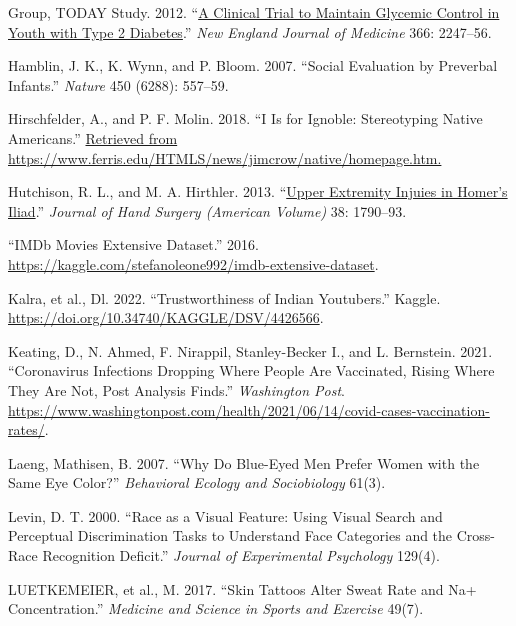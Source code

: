 \documentclass[
]{report}
\newlength{\cslhangindent}
\newenvironment{CSLReferences}[2] %
 {\begin{list}{}{%
  \setlength{\itemindent}{0pt}
  \setlength{\leftmargin}{0pt}
  \setlength{\parsep}{0pt}
  \ifodd #1
   \setlength{\leftmargin}{\cslhangindent}
   \setlength{\itemindent}{-1\cslhangindent}
  \fi
  \setlength{\itemsep}{#2\baselineskip}}}
 {\end{list}}
\begin{document}
\begin{CSLReferences}{1}{0}
Group, TODAY Study. 2012. {``\href{https://www.ncbi.nlm.nih.gov/pubmed/22540912}{A Clinical Trial to Maintain Glycemic Control in Youth with Type 2 Diabetes}.''} \emph{New England Journal of Medicine} 366: 2247--56.

Hamblin, J. K., K. Wynn, and P. Bloom. 2007. {``Social Evaluation by Preverbal Infants.''} \emph{Nature} 450 (6288): 557--59.

Hirschfelder, A., and P. F. Molin. 2018. {``I Is for Ignoble: Stereotyping Native Americans.''} \href{Retrieved\%20from\%20https://www.ferris.edu/HTMLS/news/jimcrow/native/homepage.htm.}{Retrieved from https://www.ferris.edu/HTMLS/news/jimcrow/native/homepage.htm.}

Hutchison, R. L., and M. A. Hirthler. 2013. {``\href{https://www.ncbi.nlm.nih.gov/pubmed/23932117}{Upper Extremity Injuies in Homer's Iliad}.''} \emph{Journal of Hand Surgery (American Volume)} 38: 1790--93.

{``{IMDb} Movies Extensive Dataset.''} 2016. \url{https://kaggle.com/stefanoleone992/imdb-extensive-dataset}.

Kalra, et al., Dl. 2022. {``Trustworthiness of Indian Youtubers.''} Kaggle. \url{https://doi.org/10.34740/KAGGLE/DSV/4426566}.

Keating, D., N. Ahmed, F. Nirappil, Stanley-Becker I., and L. Bernstein. 2021. {``Coronavirus Infections Dropping Where People Are Vaccinated, Rising Where They Are Not, Post Analysis Finds.''} \emph{Washington Post}. \url{https://www.washingtonpost.com/health/2021/06/14/covid-cases-vaccination-rates/}.

Laeng, Mathisen, B. 2007. {``Why Do Blue-Eyed Men Prefer Women with the Same Eye Color?''} \emph{Behavioral Ecology and Sociobiology} 61(3).

Levin, D. T. 2000. {``Race as a Visual Feature: Using Visual Search and Perceptual Discrimination Tasks to Understand Face Categories and the Cross-Race Recognition Deficit.''} \emph{Journal of Experimental Psychology} 129(4).

LUETKEMEIER, et al., M. 2017. {``Skin Tattoos Alter Sweat Rate and Na+ Concentration.''} \emph{Medicine and Science in Sports and Exercise} 49(7).


\end{CSLReferences}
\end{document}
